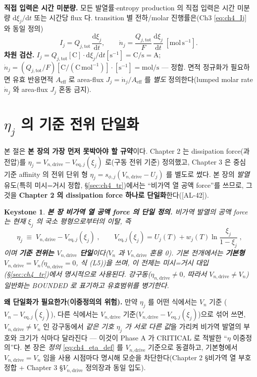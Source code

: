 \documentclass[11pt,a4paper]{article}
\newtheorem*{keybox}{Keystone}
\newcommand{\dd}{\mathrm{d}}
\newcommand{\eff}{\mathrm{eff}}
\newcommand{\eq}{\mathrm{eq}}
\newcommand{\drive}{\mathrm{drive}}
\newcommand{\tot}{\mathrm{tot}}
\newcommand{\AL}[1]{\textsf{[AL-#1]}}
\begin{document}
\textbf{직접 입력은 시간 미분량.} 모든 발열률$\cdot$entropy production 의 직접 입력은 시간 미분량 $\dd\xi_j/\dd t$
또는 시간당 flux 다. transition 별 전하/molar 진행률은(Ch3 \eqref{eq:ch4_Ij} 와 동일 정의)
\begin{equation}
I_j=Q_{j,\tot}\,\frac{\dd\xi_j}{\dd t},\qquad
\dot n_j=\frac{Q_{j,\tot}}{F}\,\frac{\dd\xi_j}{\dd t}\ [\mathrm{mol\,s^{-1}}].
\label{eq:ch4_Ij}
\end{equation}
\textbf{차원 검산.} $I_j=Q_{j,\tot}[\mathrm C]\cdot\dd\xi_j/\dd t[\mathrm{s^{-1}}]=\mathrm{C/s}=\mathrm A$;
$\dot n_j=(Q_{j,\tot}/F)[\mathrm{C}/(\mathrm{C\,mol^{-1}})]\cdot[\mathrm{s^{-1}}]=\mathrm{mol/s}$ — 정합. 면적
정규화가 필요하면 유효 반응면적 $A_{\eff}$ 로 area-flux $J_j=\dot n_j/A_{\eff}$ 를 \emph{별도} 정의한다(lumped
molar rate $\dot n_j$ 와 area-flux $J_j$ 혼동 금지).

\section{$\eta_j$ 의 기준 전위 단일화}\label{sec:ch4_eta_single}
본 절은 \textbf{본 장의 가장 먼저 못박아야 할 규약}이다. Chapter 2 는 dissipation force(과전압)를
$\eta_j=V_{n,\drive}-V_{\eq,j}(\xi_j)$ 로(구동 전위 기준) 정의했고, Chapter 3 은 중심 기준 affinity 의
전위 단위 형 $\eta_j=s_{\phi,j}(V_{n,\drive}-U_j)$ 를 별도로 썼다. 본 장의 \emph{발열} 유도(특히 미시=거시
정합, \S\ref{sec:ch4_tr})에서는 ``비가역 열 공액 force''를 쓰므로, 그것을 \textbf{Chapter 2 의 dissipation
force 하나로 단일화}한다(\AL{42}).
\begin{keybox}
\textbf{본 장 비가역 열 공액 force 의 단일 정의.} 비가역 발열의 공액 force 는 \emph{현재}
$\xi_j$ 의 국소 평형으로부터의 이탈, 즉
\begin{equation}
\boxed{\;\eta_j\;\equiv\;V_{n,\drive}-V_{\eq,j}(\xi_j)\;,\qquad V_{\eq,j}(\xi_j)=U_j(T)+w_j(T)\ln\frac{\xi_j}{1-\xi_j}\;,}
\label{eq:ch4_eta_def}
\end{equation}
이며 \textbf{기준 전위는 $V_{n,\drive}$ 단일}이다($V_n$ 과 $V_{n,\drive}$ 혼용 0). 기본 전개에서는
\textbf{기본형 $V_{n,\drive}=V_n$}($\eta_{n,\drive}=0$, 식 (L5))을 쓰며, 이 전제는 미시=거시 대입
(\S\ref{sec:ch4_tr})에서 \emph{명시적으로} 사용된다. 강구동($\eta_{n,\drive}\ne0$, 따라서 $V_{n,\drive}\ne V_n$)
일반화는 BOUNDED 로 표기하고 유효범위를 병기한다.
\end{keybox}
\textbf{왜 단일화가 필요한가(이중정의의 위험).} 만약 $\eta_j$ 를 어떤 식에서는 $V_n$ 기준
($V_n-V_{\eq,j}(\xi_j)$), 다른 식에서는 $V_{n,\drive}$ 기준($V_{n,\drive}-V_{\eq,j}(\xi_j)$)으로 섞어 쓰면,
$V_{n,\drive}\ne V_n$ 인 강구동에서 \emph{같은 기호 $\eta_j$ 가 서로 다른 값}을 가리켜 비가역 발열의 부호와
크기가 식마다 달라진다 — 이것이 Phase A 가 CRITICAL 로 적발한 ``$\eta$ 이중정의''다. 본 장은 \emph{정의}
\eqref{eq:ch4_eta_def} 를 $V_{n,\drive}$ 기준으로 동결하고, 기본형에서 $V_{n,\drive}=V_n$ 임을 사용 시점마다
명시해 모순을 차단한다(Chapter 2 \S 비가역 열 부호 정합 + Chapter 3 \S$V_{n,\drive}$ 정의장과 동일 입도).
\end{document}
